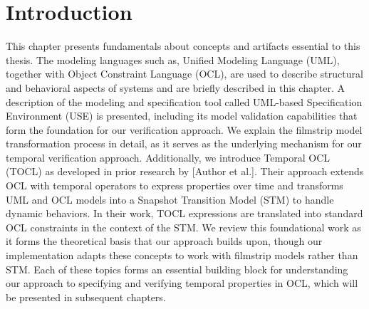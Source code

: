 \setlength{\parindent}{1cm}

\section{Introduction}

\hspace{1cm} This chapter presents fundamentals about concepts and artifacts essential 
to this thesis. The modeling languages such as, Unified Modeling Language (UML), 
together with Object Constraint Language (OCL), are used to describe structural and 
behavioral aspects of systems and are briefly described in this chapter. A description 
of the modeling and specification tool called UML-based Specification Environment (USE)
is presented, including its model validation capabilities that form the foundation for 
our verification approach. We explain the filmstrip model transformation process in 
detail, as it serves as the underlying mechanism for our temporal verification approach.
Additionally, we introduce Temporal OCL (TOCL) as developed in prior research by [Author et al.]. 
Their approach extends OCL with temporal operators to express properties over time and transforms 
UML and OCL models into a Snapshot Transition Model (STM) to handle dynamic behaviors. 
In their work, TOCL expressions are translated into standard OCL constraints in the context 
of the STM. We review this foundational work as it forms the theoretical basis that our 
approach builds upon, though our implementation adapts these concepts to work with filmstrip 
models rather than STM. Each of these topics forms an essential building block for understanding 
our approach to specifying and verifying temporal properties in OCL, which will be presented in 
subsequent chapters.